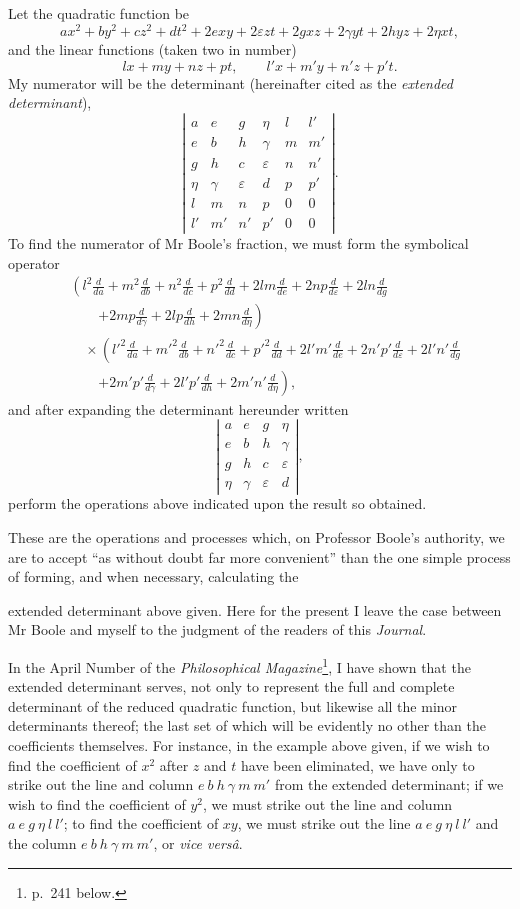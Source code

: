 \documentclass[11pt]{article}
\newcommand{\sourcepage}[1]{\marginpar{\scriptsize p.~#1}}
\begin{document}
{{Let the quadratic function be
\[
 ax^2+by^2+cz^2+dt^2+2exy+2\varepsilon zt+2gxz+2\gamma yt+2hyz+2\eta xt,
\]
and the linear functions (taken two in number)
\[
 lx+my+nz+pt,\qquad l'x+m'y+n'z+p't.
\]
My numerator will be the determinant (hereinafter cited as the \emph{extended determinant}),
\[
\left|
\begin{array}{cccccc}
a&e&g&\eta&l&l'\\
e&b&h&\gamma&m&m'\\
g&h&c&\varepsilon&n&n'\\
\eta&\gamma&\varepsilon&d&p&p'\\
l&m&n&p&0&0\\
l'&m'&n'&p'&0&0
\end{array}
\right|.
\]
To find the numerator of Mr Boole's fraction, we must form the symbolical operator
\[
\begin{aligned}
&\left(
 l^2\frac{d}{da}+m^2\frac{d}{db}+n^2\frac{d}{dc}+p^2\frac{d}{dd}
 +2lm\frac{d}{de}+2np\frac{d}{d\varepsilon}+2ln\frac{d}{dg}\right.\\
&\qquad\left.
 +2mp\frac{d}{d\gamma}+2lp\frac{d}{dh}+2mn\frac{d}{d\eta}
\right)\\
&\quad{}\times
\left(
 l'^2\frac{d}{da}+m'^2\frac{d}{db}+n'^2\frac{d}{dc}+p'^2\frac{d}{dd}
 +2l'm'\frac{d}{de}+2n'p'\frac{d}{d\varepsilon}+2l'n'\frac{d}{dg}\right.\\
&\qquad\left.
 +2m'p'\frac{d}{d\gamma}+2l'p'\frac{d}{dh}+2m'n'\frac{d}{d\eta}
\right),
\end{aligned}
\]
and after expanding the determinant hereunder written
\[
\left|
\begin{array}{cccc}
a&e&g&\eta\\
e&b&h&\gamma\\
g&h&c&\varepsilon\\
\eta&\gamma&\varepsilon&d
\end{array}
\right|,
\]
perform the operations above indicated upon the result so obtained.

These are the operations and processes which, on Professor Boole's authority, we are to accept ``as without doubt far more convenient'' than the one simple process of forming, and when necessary, calculating the

\sourcepage{183}
extended determinant above given. Here for the present I leave the case between Mr Boole and myself to the judgment of the readers of this \emph{Journal}.

In the April Number of the \emph{Philosophical Magazine}\footnote{p.~241 below.}, I have shown that the extended determinant serves, not only to represent the full and complete determinant of the reduced quadratic function, but likewise all the minor determinants thereof; the last set of which will be evidently no other than the coefficients themselves. For instance, in the example above given, if we wish to find the coefficient of $x^2$ after $z$ and $t$ have been eliminated, we have only to strike out the line and column $e\ b\ h\ \gamma\ m\ m'$ from the extended determinant; if we wish to find the coefficient of $y^2$, we must strike out the line and column $a\ e\ g\ \eta\ l\ l'$; to find the coefficient of $xy$, we must strike out the line $a\ e\ g\ \eta\ l\ l'$ and the column $e\ b\ h\ \gamma\ m\ m'$, or \emph{vice vers\^a}.

}}
\end{document}
